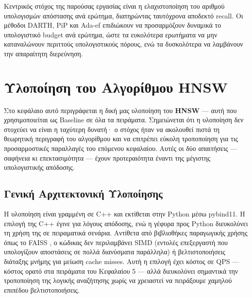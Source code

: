\documentclass[12pt,a4paper]{article}
\begin{document}
Κεντρικός στόχος της παρούσας εργασίας είναι η ελαχιστοποίηση του αριθμού υπολογισμών απόστασης ανά ερώτημα, διατηρώντας ταυτόχρονα αποδεκτό recall. Οι μέθοδοι DARTH, PiP και Ada-ef επιδιώκουν να προσαρμόζουν δυναμικά το υπολογιστικό budget ανά ερώτημα, ώστε τα ευκολότερα ερωτήματα να μην καταναλώνουν περιττούς υπολογιστικούς πόρους, ενώ τα δυσκολότερα να λαμβάνουν την απαραίτητη διερεύνηση.
\newpage
\section{Υλοποίηση του Αλγορίθμου HNSW}

Στο κεφάλαιο αυτό περιγράφεται η δική μας υλοποίηση του \textbf{HNSW} --- αυτή που χρησιμοποιείται ως Baseline σε όλα τα πειράματα. Σημειώνεται ότι η υλοποίηση δεν στοχεύει να είναι η ταχύτερη δυνατή· ο στόχος ήταν να ακολουθεί πιστά τη θεωρητική περιγραφή του αλγορίθμου και να επιτρέπει εύκολη τροποποίηση για τις προσαρμοστικές παραλλαγές του επόμενου κεφαλαίου. Αυτές οι δύο απαιτήσεις --- σαφήνεια κι επεκτασιμότητα --- έχουν προτεραιότητα έναντι της μέγιστης υπολογιστικής απόδοσης.

\subsection{Γενική Αρχιτεκτονική Υλοποίησης}
Η υλοποίηση είναι γραμμένη σε C++ και εκτίθεται στην Python μέσω pybind11. Η επιλογή της C++ έγινε για λόγους απόδοσης, ενώ η γέφυρα προς Python διευκολύνει τη χρήση της σε πειραματικά σενάρια. Αντίθετα από βιβλιοθήκες παραγωγικής χρήσης όπως το FAISS \cite{faiss2017}, ο κώδικας δεν περιλαμβάνει SIMD (εντολές επεξεργαστή που υπολογίζουν αποστάσεις σε πολλά διανύσματα παράλληλα) ή βελτιστοποιήσεις διάταξης μνήμης για μείωση cache misses. Αυτή η επιλογή έχει κόστος σε QPS --- κόστος ορατό στα πειράματα του Κεφαλαίου 5 --- αλλά διευκολύνει σημαντικά την τροποποίηση της λογικής αναζήτησης χωρίς να χρειαστεί να πειράξουμε χαμηλού επιπέδου βελτιστοποιήσεις.
\end{document}
